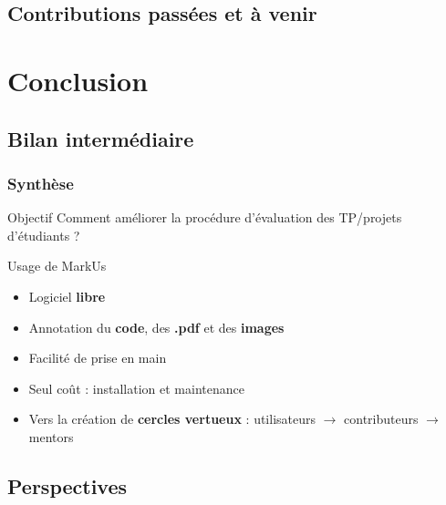 \documentclass[hyperref,french,usenames,xcolor=dvipsnames]{beamer}
\begin{document}
\subsection*{Contributions passées et à venir}

\section{Conclusion}

\subsection*{Bilan intermédiaire}

\frame
{
  \frametitle{Synthèse}

\begin{alertblock}{Objectif}
Comment améliorer la procédure d'évaluation des TP/projets d'étudiants ?
\end{alertblock}

\begin{block}{Usage de MarkUs}

\begin{itemize}
\item Logiciel \textbf{libre} 
\item Annotation du \textbf{code}, des \textbf{.pdf} et des \textbf{images} 
\item Facilité de prise en main
\item Seul coût : installation et maintenance 
\item Vers la création de \textbf{cercles vertueux} : utilisateurs $\rightarrow$ contributeurs $\rightarrow$ mentors
\end{itemize}
\end{block}
}

\subsection*{Perspectives}

\end{document}
